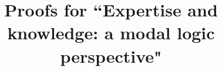 \documentclass[sn-apa]{sn-jnl}%
\theoremstyle{thmstyleone}%
\theoremstyle{thmstyletwo}%
\theoremstyle{thmstylethree}%
\begin{document}
\newcommand{\appendixtitle}{Proofs for ``Expertise and knowledge: a modal logic perspective"}
\title[\appendixtitle]{\appendixtitle}

\author[1]{ }

\maketitle

\begin{appendices}
    
\end{appendices}

%
\end{document}
